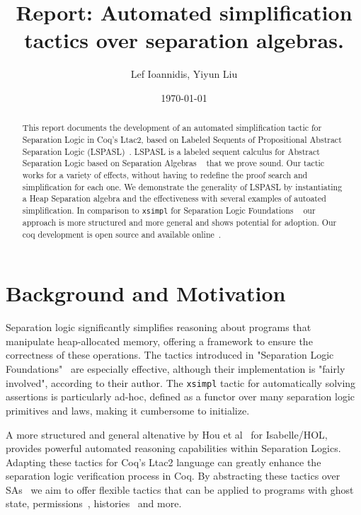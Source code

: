 \documentclass[12pt,lettersize]{article}
\title{Report: Automated simplification tactics over separation algebras.}
\author{Lef Ioannidis, Yiyun Liu}
\date{\today}
\begin{document}
\maketitle

\begin{abstract}
This report documents the development of an automated simplification tactic for Separation Logic in Coq's Ltac2, based on 
Labeled Sequents of Propositional Abstract Separation Logic (LSPASL)~\cite{hou2017proof}. LSPASL is a labeled sequent calculus
for Abstract Separation Logic based on Separation Algebras ~\cite{calcagno2007local} that we prove sound. Our tactic works for 
a variety of effects, without having to redefine the proof search and simplification for each one. We demonstrate the generality of LSPASL
by instantiating a Heap Separation algebra and the effectiveness with several examples of autoated simplification.
In comparison to \texttt{xsimpl} for Separation Logic Foundations ~\cite{chargueraud2020separation}
our approach is more structured and more general and shows potential for adoption. Our coq development is open source and available
online~\cite{github}.
\end{abstract}

\section{Background and Motivation}
Separation logic significantly simplifies reasoning about programs that manipulate heap-allocated memory, offering a framework
to ensure the correctness of these operations. The tactics introduced in "Separation Logic Foundations"~\cite{chargueraud2020separation}
are especially effective, although their implementation is "fairly involved", according to their author. The \texttt{xsimpl} tactic
for automatically solving assertions is particularly ad-hoc, defined as a functor over many separation logic primitives and laws,
making it cumbersome to initialize.

A more structured and general altenative by Hou et al~\cite{hou2017proof} for Isabelle/HOL, provides powerful automated reasoning
capabilities within Separation Logics. Adapting these tactics for Coq's Ltac2 language can greatly enhance the separation logic verification process in Coq.
By abstracting these tactics over SAs~\cite{calcagno2007local} we aim to offer
flexible tactics that can be applied to programs with ghost state, permissions~\cite{bornat2005permission}, 
histories~\cite{sergey2015specifying} and more.
\end{document}
